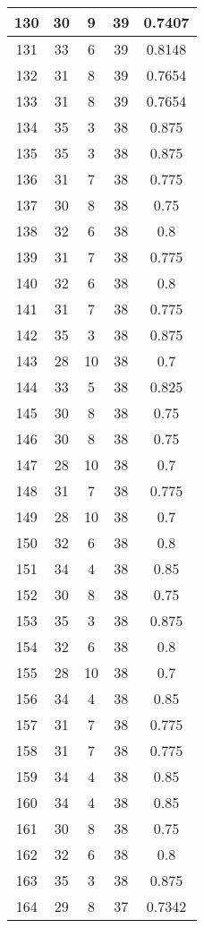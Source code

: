 \documentclass[letterpaper, 12pt]{article}
\begin{document}
\begin{longtable}{|c|c|c|c|c|}
\hline
130 & 30 & 9 & 39 & 0.7407 \\
\hline
131 & 33 & 6 & 39 & 0.8148 \\
\hline
132 & 31 & 8 & 39 & 0.7654 \\
\hline
133 & 31 & 8 & 39 & 0.7654 \\
\hline
134 & 35 & 3 & 38 & 0.875 \\
\hline
135 & 35 & 3 & 38 & 0.875 \\
\hline
136 & 31 & 7 & 38 & 0.775 \\
\hline
137 & 30 & 8 & 38 & 0.75 \\
\hline
138 & 32 & 6 & 38 & 0.8 \\
\hline
139 & 31 & 7 & 38 & 0.775 \\
\hline
140 & 32 & 6 & 38 & 0.8 \\
\hline
141 & 31 & 7 & 38 & 0.775 \\
\hline
142 & 35 & 3 & 38 & 0.875 \\
\hline
143 & 28 & 10 & 38 & 0.7 \\
\hline
144 & 33 & 5 & 38 & 0.825 \\
\hline
145 & 30 & 8 & 38 & 0.75 \\
\hline
146 & 30 & 8 & 38 & 0.75 \\
\hline
147 & 28 & 10 & 38 & 0.7 \\
\hline
148 & 31 & 7 & 38 & 0.775 \\
\hline
149 & 28 & 10 & 38 & 0.7 \\
\hline
150 & 32 & 6 & 38 & 0.8 \\
\hline
151 & 34 & 4 & 38 & 0.85 \\
\hline
152 & 30 & 8 & 38 & 0.75 \\
\hline
153 & 35 & 3 & 38 & 0.875 \\
\hline
154 & 32 & 6 & 38 & 0.8 \\
\hline
155 & 28 & 10 & 38 & 0.7 \\
\hline
156 & 34 & 4 & 38 & 0.85 \\
\hline
157 & 31 & 7 & 38 & 0.775 \\
\hline
158 & 31 & 7 & 38 & 0.775 \\
\hline
159 & 34 & 4 & 38 & 0.85 \\
\hline
160 & 34 & 4 & 38 & 0.85 \\
\hline
161 & 30 & 8 & 38 & 0.75 \\
\hline
162 & 32 & 6 & 38 & 0.8 \\
\hline
163 & 35 & 3 & 38 & 0.875 \\
\hline
164 & 29 & 8 & 37 & 0.7342 \\

\end{longtable}
\end{document}

